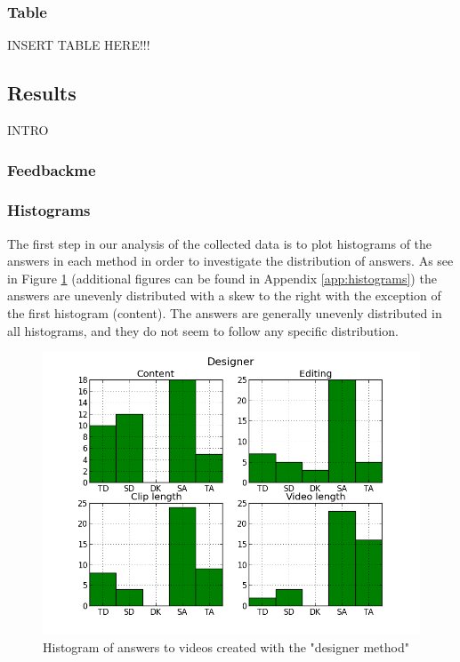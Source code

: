 \subsubsection{Table}
%
INSERT TABLE HERE!!!
%
\subsection{Results}
%
INTRO
%
\subsubsection{Feedbackme}
%
%
\subsubsection{Histograms}
%
The first step in our analysis of the collected data is to plot histograms of the answers in each method in order to investigate the distribution of answers. As see in Figure \ref{fig:hist_design} (additional figures can be found in Appendix \ref{app:histograms}) the answers are unevenly distributed with a skew to the right with the exception of the first histogram (content). The answers are generally unevenly distributed in all histograms, and they do not seem to follow any specific distribution. %
%
\begin{figure}
     \centering
     \includegraphics[width=1.0\textwidth]{img/designer_barplot.png}
     \caption{Histogram of answers to videos created with the "designer method"}\label{fig:hist_design}
\end{figure}\\
%
